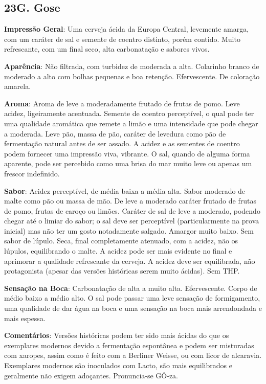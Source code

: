 \subsection*{23G. Gose}

\textbf{Impressão Geral}: Uma cerveja ácida da Europa Central, levemente amarga, com um caráter de sal e semente de coentro distinto, porém contido. Muito refrescante, com um final seco, alta carbonatação e sabores vivos.

\textbf{Aparência}: Não filtrada, com turbidez de moderada a alta. Colarinho branco de moderado a alto com bolhas pequenas e boa retenção. Efervescente. De coloração amarela.

\textbf{Aroma}: Aroma de leve a moderadamente frutado de frutas de pomo. Leve acidez, ligeiramente acentuada. Semente de coentro perceptível, o qual pode ter uma qualidade aromática que remete a limão e uma intensidade que pode chegar a moderada. Leve pão, massa de pão, caráter de levedura como pão de fermentação natural antes de ser assado. A acidez e as sementes de coentro podem fornecer uma impressão viva, vibrante. O sal, quando de alguma forma aparente, pode ser percebido como uma brisa do mar muito leve ou apenas um frescor indefinido.

\textbf{Sabor}: Acidez perceptível, de média baixa a média alta. Sabor moderado de malte como pão ou massa de mão. De leve a moderado caráter frutado de frutas de pomo, frutas de caroço ou limões. Caráter de sal de leve a moderado, podendo chegar até o limiar do sabor; o sal deve ser perceptível (particularmente na prova inicial) mas não ter um gosto notadamente salgado. Amargor muito baixo. Sem sabor de lúpulo. Seca, final completamente atenuado, com a acidez, não  os lúpulos, equilibrando o malte. A acidez pode ser mais evidente no final e aprimorar a qualidade refrescante da cerveja. A acidez deve ser equilibrada, não protagonista (apesar das versões históricas serem muito ácidas). Sem THP.

\textbf{Sensação na Boca}: Carbonatação de alta a muito alta. Efervescente. Corpo de médio baixo a médio alto. O sal pode passar uma leve sensação de formigamento, uma qualidade de dar água na boca e uma sensação na boca mais arrendondada e mais espessa.

\textbf{Comentários}: Versões históricas podem ter sido mais ácidas do que os exemplares modernos devido a fermentação espontânea e podem ser misturadas com xaropes, assim como é feito com a Berliner Weisse, ou com licor de alcaravia. Exemplares modernos são inoculados com Lacto, são mais equilibrados e geralmente não exigem adoçantes. Pronuncia-se GÔ-za.

